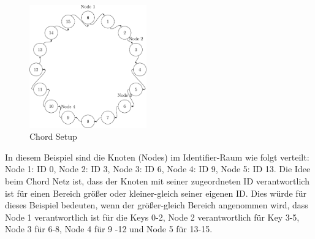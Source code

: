 \documentclass[../vs-script-first-v01.tex]{subfiles}
\begin{document}
\begin{figure}[!ht]
  \centering
  \includegraphics[width=0.45\textwidth]{fig/tex-grapics/chord.pdf.png}
  \caption{Chord Setup}
  \label{fig:chord}
\end{figure}

In diesem Beispiel sind die Knoten (Nodes) im Identifier-Raum wie folgt verteilt: Node 1: ID 0, Node 2: ID 3, Node 3: ID 6, Node 4: ID 9, Node 5: ID 13. Die Idee beim Chord Netz ist, dass der Knoten mit seiner zugeordneten ID verantwortlich ist für einen Bereich größer oder kleiner-gleich seiner eigenen ID. Dies würde für dieses Beispiel bedeuten, wenn der größer-gleich Bereich angenommen wird, dass Node 1 verantwortlich ist für die Keys 0-2, Node 2 verantwortlich für Key 3-5, Node 3 für 6-8, Node 4 für 9 -12 und Node 5 für 13-15. 
\end{document}
